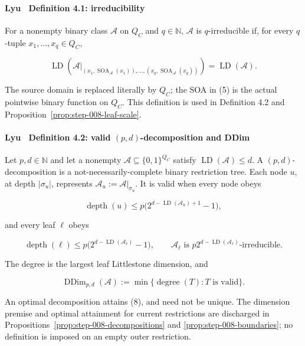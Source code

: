 \paragraph{Lyu~\citep{lyu2025} Definition 4.1: irreducibility}

For a nonempty binary class \(\mathcal A\) on \(Q_C\) and
\(q\in\mathbb N\), \(\mathcal A\) is \(q\)-irreducible if, for every
\(q\)-tuple \(x_1,\ldots,x_q\in Q_C\),

\[
 \operatorname{LD}\!\left(
 \mathcal A|_{(x_1,\operatorname{SOA}_{\mathcal A}(x_1)),\ldots,
                    (x_q,\operatorname{SOA}_{\mathcal A}(x_q))}
 \right)
 =\operatorname{LD}(\mathcal A).
\tag{5}
\]

The source domain is replaced literally by \(Q_C\); the SOA in (5) is the
actual pointwise binary function on \(Q_C\). This definition is used in
Definition 4.2 and Proposition~\ref{prop:step-008-leaf-scale}.

\paragraph{Lyu~\citep{lyu2025} Definition 4.2: valid \((p,d)\)-decomposition and DDim}

Let \(p,d\in\mathbb N\) and let a nonempty
\(\mathcal A\subseteq\{0,1\}^{Q_C}\) satisfy
\(\operatorname{LD}(\mathcal A)\le d\). A \((p,d)\)-decomposition is a
not-necessarily-complete binary restriction tree. Each node \(u\), at
depth \(|\sigma_u|\), represents
\(\mathcal A_u:=\mathcal A|_{\sigma_u}\). It is valid when every node obeys

\[
 \operatorname{depth}(u)
 \le p\bigl(2^{d-\operatorname{LD}(\mathcal A_u)+1}-1\bigr),
\tag{6}
\]

and every leaf \(\ell\) obeys

\[
 \operatorname{depth}(\ell)
 \le p\bigl(2^{d-\operatorname{LD}(\mathcal A_\ell)}-1\bigr),
 \qquad
 \mathcal A_\ell\text{ is }
 p2^{d-\operatorname{LD}(\mathcal A_\ell)}
 \text{-irreducible}.
\tag{7}
\]

The degree is the largest leaf Littlestone dimension, and

\[
 \operatorname{DDim}_{p,d}(\mathcal A)
 :=\min\{\operatorname{degree}(T):T\text{ is valid}\}.
\tag{8}
\]

An optimal decomposition attains (8), and need not be unique. The
dimension premise and optimal attainment for current restrictions are
discharged in Propositions~\ref{prop:step-008-decompositions} and
\ref{prop:step-008-boundaries}; no definition is imposed on an empty outer
restriction.

